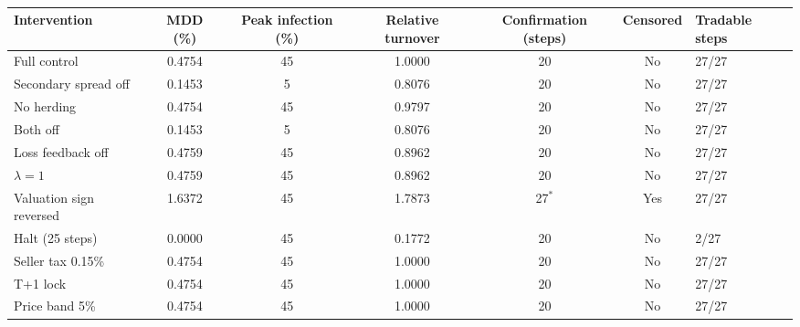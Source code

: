 \begin{table}[t]
\centering\small
\caption{}
\label{tab:rq2_results}
\begin{tabularx}{\textwidth}{@{}l c c c c c X@{}}
\toprule
Intervention & MDD (\%) & Peak infection (\%) & Relative turnover & Confirmation (steps) & Censored & Tradable steps \\
\midrule
Full control & 0.4754 & 45 & 1.0000 & 20 & No & 27/27 \\
Secondary spread off & 0.1453 & 5 & 0.8076 & 20 & No & 27/27 \\
No herding & 0.4754 & 45 & 0.9797 & 20 & No & 27/27 \\
Both off & 0.1453 & 5 & 0.8076 & 20 & No & 27/27 \\
Loss feedback off & 0.4759 & 45 & 0.8962 & 20 & No & 27/27 \\
$\lambda=1$ & 0.4759 & 45 & 0.8962 & 20 & No & 27/27 \\
Valuation sign reversed & 1.6372 & 45 & 1.7873 & 27$^{*}$ & Yes & 27/27 \\
Halt (25 steps) & 0.0000 & 45 & 0.1772 & 20 & No & 2/27 \\
Seller tax 0.15\% & 0.4754 & 45 & 1.0000 & 20 & No & 27/27 \\
T+1 lock & 0.4754 & 45 & 1.0000 & 20 & No & 27/27 \\
Price band 5\% & 0.4754 & 45 & 1.0000 & 20 & No & 27/27 \\
\bottomrule
\end{tabularx}
\end{table}
